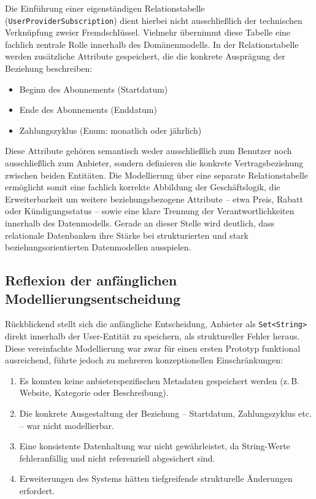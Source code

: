 Die Einführung einer eigenständigen Relationstabelle (\texttt{UserProviderSubscription})
dient hierbei nicht ausschließlich der technischen Verknüpfung zweier Fremdschlüssel.
Vielmehr übernimmt diese Tabelle eine fachlich zentrale Rolle innerhalb des
Domänenmodells. In der Relationstabelle werden zusätzliche Attribute gespeichert,
die die konkrete Ausprägung der Beziehung beschreiben:

\begin{itemize}
    \item Beginn des Abonnements (Startdatum)
    \item Ende des Abonnements (Enddatum)
    \item Zahlungszyklus (Enum: monatlich oder jährlich)
\end{itemize}

Diese Attribute gehören semantisch weder ausschließlich zum Benutzer noch
ausschließlich zum Anbieter, sondern definieren die konkrete Vertragsbeziehung
zwischen beiden Entitäten. Die Modellierung über eine separate Relationstabelle
ermöglicht somit eine fachlich korrekte Abbildung der Geschäftslogik, die
Erweiterbarkeit um weitere beziehungsbezogene Attribute -- etwa Preis, Rabatt
oder Kündigungsstatus -- sowie eine klare Trennung der Verantwortlichkeiten
innerhalb des Datenmodells. Gerade an dieser Stelle wird deutlich, dass
relationale Datenbanken ihre Stärke bei strukturierten und stark
beziehungsorientierten Datenmodellen ausspielen.

\subsection{Reflexion der anfänglichen Modellierungsentscheidung}

Rückblickend stellt sich die anfängliche Entscheidung, Anbieter als
\texttt{Set<String>} direkt innerhalb der User-Entität zu speichern, als
struktureller Fehler heraus. Diese vereinfachte Modellierung war zwar für einen
ersten Prototyp funktional ausreichend, führte jedoch zu mehreren konzeptionellen
Einschränkungen:

\begin{enumerate}
    \item Es konnten keine anbieterspezifischen Metadaten gespeichert werden
    (z.\,B. Website, Kategorie oder Beschreibung).
    \item Die konkrete Ausgestaltung der Beziehung -- Startdatum, Zahlungszyklus
    etc. -- war nicht modellierbar.
    \item Eine konsistente Datenhaltung war nicht gewährleistet, da String-Werte
    fehleranfällig und nicht referenziell abgesichert sind.
    \item Erweiterungen des Systems hätten tiefgreifende strukturelle Änderungen
    erfordert.
\end{enumerate}

